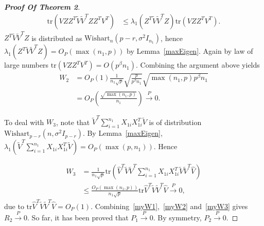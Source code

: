 \begin{proof}[\textbf{Proof Of Theorem 2}]
\begin{equation*}
    \begin{aligned}
        \mathrm{tr}(VZZ^T \tilde{V}\tilde{V}^T ZZ^T V^T)&\leq
        \lambda_1 (Z^T\tilde{V}\tilde{V}^T Z)\mathrm{tr}(VZZ^T V^T).
    \end{aligned}
\end{equation*}
$Z^T\tilde{V}\tilde{V}^T Z$ is distributed as $\textrm{Wishart}_{n}(p-r,\sigma^2 I_{n_1})$, hence $\lambda_1 (Z^T\tilde{V}\tilde{V}^T Z)=O_P(\max(n_1,p))$ by Lemma~\ref{maxEigen}. Again by law of large numbers $\mathrm{tr}(VZZ^T V^T)=O(p^{\beta} n_1)$. Combining the argument above yields
\begin{equation}\label{myW2}
    \begin{aligned}
        W_2&=O_P(1)\frac{1}{n_1\sqrt{p}}\sqrt{\frac{p}{p^{\beta}n_1}}\sqrt{\max(n_1,p)p^{\beta}n_1}\\
        &=O_P(\frac{\sqrt{\max(n_1,p)}}{n_1})\xrightarrow{P}0.
    \end{aligned}
\end{equation}

To deal with $W_3$, note that $\tilde{V}^T\sum_{i=1}^{n_1}X_{1i}X_{1i}^T\tilde{V}$ is of distribution $\textrm{Wishart}_{p-r}(n,\sigma^2 I_{p-r})$. By Lemma~\ref{maxEigen}, $\lambda_1(\tilde{V}^T\sum_{i=1}^{n_1}X_{1i}X_{1i}^T\tilde{V})=O_P(\max(p,n_1))$. 
Hence

\begin{equation}\label{myW3}
    \begin{aligned}
        W_3&=\frac{1}{n_1\sqrt{p}}\mathrm{tr}(\hat{V}^T\tilde{V}\tilde{V}^T\sum_{i=1}^{n_1}X_{1i}X_{1i}^T\tilde{V}\tilde{V}^T \hat{V})\\
        &\leq \frac{O_{P}(\max(n_1,p))}{n_1\sqrt{p}}\mathrm{tr} \hat{V}^T\tilde{V}\tilde{V}^T\hat{V}\xrightarrow{P}0,
    \end{aligned}
\end{equation}
due to $\mathrm{tr} \hat{V}^T\tilde{V}\tilde{V}^T\hat{V}=O_P(1)$. Combining~\eqref{myW1},~\eqref{myW2} and~\eqref{myW3} gives $R_2\xrightarrow{P}0$. So far, it has been proved that $P_1\xrightarrow{P}0$. By symmetry, $P_2\xrightarrow{P}0$. 


\end{proof}
